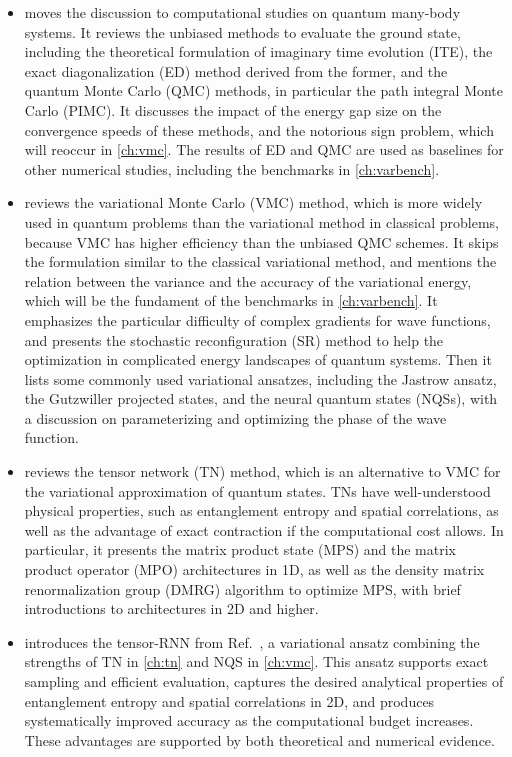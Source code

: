 \begin{itemize}
\item {} moves the discussion to computational studies on quantum many-body systems. It reviews the unbiased methods to evaluate the ground state, including the theoretical formulation of imaginary time evolution (ITE), the exact diagonalization (ED) method derived from the former, and the quantum Monte Carlo (QMC) methods, in particular the path integral Monte Carlo (PIMC).
It discusses the impact of the energy gap size on the convergence speeds of these methods, and the notorious sign problem, which will reoccur in \cref{ch:vmc}.
The results of ED and QMC are used as baselines for other numerical studies, including the benchmarks in \cref{ch:varbench}.
\item {} reviews the variational Monte Carlo (VMC) method, which is more widely used in quantum problems than the variational method in classical problems, because VMC has higher efficiency than the unbiased QMC schemes.
It skips the formulation similar to the classical variational method, and mentions the relation between the variance and the accuracy of the variational energy, which will be the fundament of the benchmarks in \cref{ch:varbench}.
It emphasizes the particular difficulty of complex gradients for wave functions, and presents the stochastic reconfiguration (SR) method to help the optimization in complicated energy landscapes of quantum systems.
Then it lists some commonly used variational ansatzes, including the Jastrow ansatz, the Gutzwiller projected states, and the neural quantum states (NQSs), with a discussion on parameterizing and optimizing the phase of the wave function.
\item {} reviews the tensor network (TN) method, which is an alternative to VMC for the variational approximation of quantum states. TNs have well-understood physical properties, such as entanglement entropy and spatial correlations, as well as the advantage of exact contraction if the computational cost allows.
In particular, it presents the matrix product state (MPS) and the matrix product operator (MPO) architectures in 1D, as well as the density matrix renormalization group (DMRG) algorithm to optimize MPS, with brief introductions to architectures in 2D and higher.
\item {} introduces the tensor-RNN from Ref.~\cite{wu2023tensor}, a variational ansatz  combining the strengths of TN in \cref{ch:tn} and NQS in \cref{ch:vmc}. This ansatz supports exact sampling and efficient evaluation, captures the desired analytical properties of entanglement entropy and spatial correlations in 2D, and produces systematically improved accuracy as the computational budget increases. These advantages are supported by both theoretical and numerical evidence.

\end{itemize}
